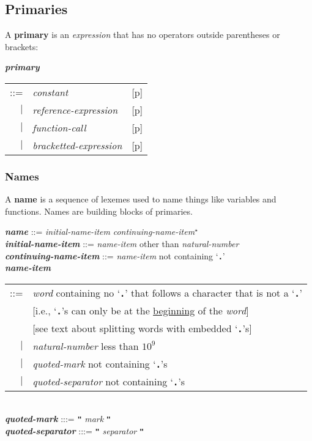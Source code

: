 \documentclass[12pt]{article}
\newcommand{\TT}[1]{{\tt \bfseries #1}}
\newcommand{\STAR}{{\Large $^\star$}}
\newcommand{\key}[1]{{\rm \bfseries #1}}
\newcommand{\emkey}[1]{{\em \bfseries #1}}
\newcommand{\pagref}[1]{p\pageref{#1}}
\newenvironment{indpar}[1][0.3in]%
	{\begin{list}{}%
		     {\setlength{\itemsep}{0in}%
		      \setlength{\topsep}{0in}%
		      \setlength{\parsep}{1ex}%
		      \setlength{\labelwidth}{#1}%
		      \setlength{\leftmargin}{#1}%
		      \addtolength{\leftmargin}{\labelsep}}%
	 \item}%
	{\end{list}}
\begin{document}
\subsection{Primaries}
\label{PRIMARIES}

A \key{primary} is an {\em expression} that has no operators outside
parentheses or brackets:
\begin{indpar}
\emkey{primary}
    \begin{tabular}[t]{@{}rll}
    ::= & {\em constant}		& [\pagref{CONSTANTS}] \\
    $|$ & {\em reference-expression}    & [\pagref{REFERENCE-EXPRESSIONS}] \\
    $|$ & {\em function-call}		& [\pagref{FUNCTION-CALLS}] \\
    $|$ & {\em bracketted-expression}	& [\pagref{BRACKETTED-EXPRESSIONS}] \\
    \end{tabular}
\end{indpar}

\subsubsection{Names}
\label{NAMES}

A \key{name} is a sequence of lexemes used to name things like
variables and functions.  Names are building blocks of primaries.

\begin{indpar}
\emkey{name}\label{NAME} ::=
    {\em initial-name-item} {\em continuing-name-item}\STAR{} \\
\emkey{initial-name-item} ::= {\em name-item} other than {\em natural-number} \\
\emkey{continuing-name-item} ::= {\em name-item} not containing `\TT{.}' \\
\emkey{name-item}\label{NAME-ITEM}
    \begin{tabular}[t]{@{}rl}
    ::= & {\em word} containing no `\TT{.}' that follows a character
                     that is not a `\TT{.}' \\
        & [i.e., `\TT{.}'s can only be at the \underline{beginning}
	   of the {\em word}] \\
        & [see text about splitting words with embedded `\TT{.}'s] \\
    $|$ & {\em natural-number} less than $10^9$ \\
    $|$ & {\em quoted-mark} not containing `\TT{.}'s \\
    $|$ & {\em quoted-separator} not containing `\TT{.}'s \\
    \end{tabular} \\
\emkey{quoted-mark} :::= \TT{"} {\em mark} \TT{"} \\
\emkey{quoted-separator} :::= \TT{"} {\em separator} \TT{"}
\end{indpar}
\end{document}
